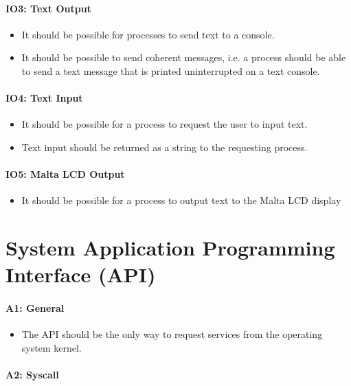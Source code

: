 \paragraph{IO3: Text Output}

\begin{itemize}
  \item It should be possible for processes to send text to a console.
  \item  It should be possible to send coherent messages, i.e. a process should be able to send a text message that is printed uninterrupted on a text console.
\end{itemize}

\paragraph{IO4: Text Input}

\begin{itemize}
  \item It should be possible for a process to request the user to input text.
  \item  Text input should be returned as a string to the requesting process.
\end{itemize}

\paragraph{IO5: Malta LCD Output}

\begin{itemize}
  \item It should be possible for a process to output text to the Malta LCD display
\end{itemize}

\section{System Application Programming Interface (API)}

\paragraph{A1: General}

\begin{itemize}
  \item The API should be the only way to request services from the operating system kernel.
\end{itemize}

\paragraph{A2: Syscall}

